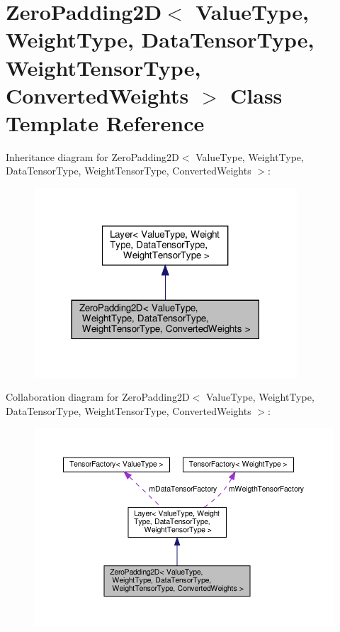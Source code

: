 \hypertarget{classZeroPadding2D}{}\section{Zero\+Padding2D$<$ Value\+Type, Weight\+Type, Data\+Tensor\+Type, Weight\+Tensor\+Type, Converted\+Weights $>$ Class Template Reference}
\label{classZeroPadding2D}


Inheritance diagram for Zero\+Padding2D$<$ Value\+Type, Weight\+Type, Data\+Tensor\+Type, Weight\+Tensor\+Type, Converted\+Weights $>$\+:
\nopagebreak
\begin{figure}[H]
\begin{center}
\leavevmode
\includegraphics[width=278pt]{classZeroPadding2D__inherit__graph}
\end{center}
\end{figure}


Collaboration diagram for Zero\+Padding2D$<$ Value\+Type, Weight\+Type, Data\+Tensor\+Type, Weight\+Tensor\+Type, Converted\+Weights $>$\+:
\nopagebreak
\begin{figure}[H]
\begin{center}
\leavevmode
\includegraphics[width=350pt]{classZeroPadding2D__coll__graph}
\end{center}
\end{figure}

